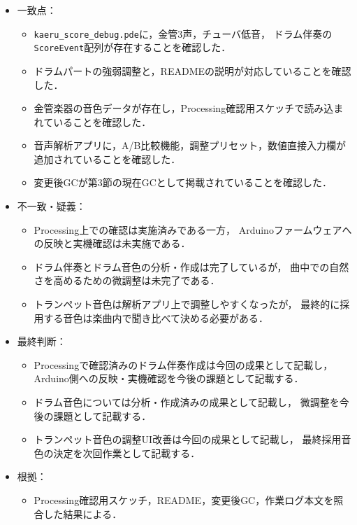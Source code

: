\documentclass[uplatex,dvipdfmx,a4paper,11pt]{jsarticle}
\begin{document}
\begin{itemize}
  \item 一致点：
    \begin{itemize}
      \item {}\texttt{kaeru\_score\_debug.pde}に，金管3声，チューバ低音，
        ドラム伴奏の\texttt{ScoreEvent}配列が存在することを確認した．
      \item {}ドラムパートの強弱調整と，READMEの説明が対応していることを確認した．
      \item {}金管楽器の音色データが存在し，Processing確認用スケッチで読み込まれていることを確認した．
      \item {}音声解析アプリに，A/B比較機能，調整プリセット，数値直接入力欄が追加されていることを確認した．
      \item {}変更後GCが第3節の現在GCとして掲載されていることを確認した．
    \end{itemize}
  \item 不一致・疑義：
    \begin{itemize}
      \item {}Processing上での確認は実施済みである一方，
        Arduinoファームウェアへの反映と実機確認は未実施である．
      \item {}ドラム伴奏とドラム音色の分析・作成は完了しているが，
        曲中での自然さを高めるための微調整は未完了である．
      \item {}トランペット音色は解析アプリ上で調整しやすくなったが，
        最終的に採用する音色は楽曲内で聞き比べて決める必要がある．
    \end{itemize}
  \item 最終判断：
    \begin{itemize}
      \item {}Processingで確認済みのドラム伴奏作成は今回の成果として記載し，
        Arduino側への反映・実機確認を今後の課題として記載する．
      \item {}ドラム音色については分析・作成済みの成果として記載し，
        微調整を今後の課題として記載する．
      \item {}トランペット音色の調整UI改善は今回の成果として記載し，
        最終採用音色の決定を次回作業として記載する．
    \end{itemize}
  \item 根拠：
    \begin{itemize}
      \item {}Processing確認用スケッチ，README，変更後GC，作業ログ本文を照合した結果による．
    \end{itemize}
\end{itemize}
\end{document}
